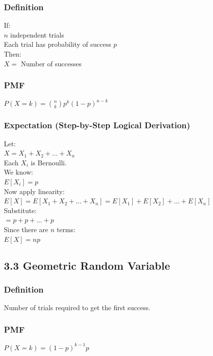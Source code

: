 \documentclass{article}
\begin{document}
\subsubsection{Definition}
If: \\
$n$ independent trials \\
Each trial has probability of success $p$ \\
Then: \\
$X=$ Number of successes

\subsubsection{PMF}
$P(X=k) = \binom{n}{k} p^k (1-p)^{n-k}$

\subsubsection{Expectation (Step-by-Step Logical Derivation)}
Let: \\
$X = X_1 + X_2 + \dots + X_n$ \\
Each $X_i$ is Bernoulli. \\
We know: \\
$E[X_i] = p$ \\
Now apply linearity: \\
$E[X] = E[X_1 + X_2 + \dots + X_n] = E[X_1] + E[X_2] + \dots + E[X_n]$ \\
Substitute: \\
$= p + p + \dots + p$ \\
Since there are $n$ terms: \\
$E[X] = np$

\subsection{3.3 Geometric Random Variable}

\subsubsection{Definition}
Number of trials required to get the first success.

\subsubsection{PMF}
$P(X=k) = (1-p)^{k-1}p$
\end{document}
